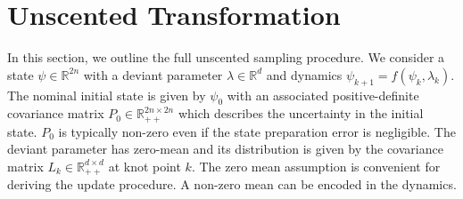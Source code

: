 \section{Unscented Transformation}
\label{appendix:unscented}
In this section, we outline the full unscented sampling procedure.
We consider a state $\psi \in \mathbb{R}^{2n}$ with
a deviant parameter $\lambda \in \mathbb{R}^{d}$ and dynamics
$\psi_{k + 1} = f(\psi_{k}, \lambda_{k})$.
The nominal initial state is given by $\psi_{0}$ with an associated
positive-definite covariance matrix $P_{0} \in \mathbb{R}_{++}^{2n \times 2n}$
which describes the uncertainty in the initial state.
$P_{0}$ is typically non-zero even if the state preparation error is negligible.
The deviant parameter
has zero-mean and its distribution is given by the covariance matrix
$L_{k} \in \mathbb{R}_{++}^{d \times d}$ at knot point $k$. The zero mean assumption
is convenient for deriving the update procedure. A non-zero mean can be encoded
in the dynamics.

